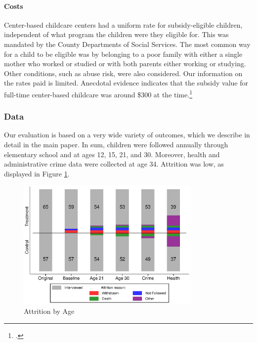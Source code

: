 \begin{appendices}
\paragraph{Costs}

\noindent Center-based childcare centers had a uniform rate for subsidy-eligible children, independent of what program the children were they eligible for. This was mandated by the County Departments of Social Services. The most common way for a child to be eligible was by belonging to a poor family with either a single mother who worked or studied or with both parents either working or studying. Other conditions, such as abuse risk, were also considered. Our information on the rates paid is limited. Anecdotal evidence indicates that the subsidy value for full-time center-based childcare was around \$300 at the time.\footnote{\citet{Kuperman_2015_Clifford-Russell-Interview}.}

\subsubsection{Data} \label{appendix:data}

Our evaluation is based on a very wide variety of outcomes, which we describe in detail in the main paper. In sum, children were followed annually through elementary school and at ages 12, 15, 21, and 30. Moreover, health and administrative crime data were collected at age 34.  Attrition was low, as displayed in Figure \ref{fig:attrition}.\\

\begin{figure}[H]
\caption{Attrition by Age} \label{fig:attrition}
    \centering
  \includegraphics[height=2.5in]{output/abc_attrition.eps}
\end{figure}


\end{appendices}
